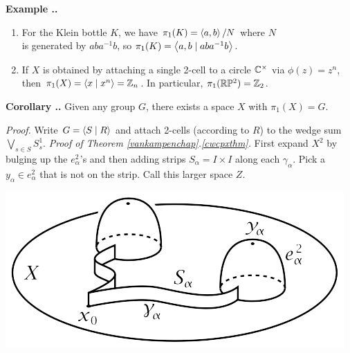 \documentclass{natsirt}
\newcounter{exm}[section]
\newenvironment{exmbox}[1][]{
\begin{redbox}[#1]\refstepcounter{exm}\textbf{Example \thesection.\theexm. }}{\end{redbox}}
\newcounter{thm}[section]
\newenvironment{corollary}[1][]{\begin{whitebox}[#1]\textbf{Corollary \thesection.\thethm. }}{\end{whitebox}}
\begin{document}
\begin{exmbox}
    \begin{enumerate}
        \item For the Klein bottle $K$, we have $\pi_1(K) = \left\langle a,b \right\rangle/N$ where $N$\\is generated by $aba^{-1}b$, so $\pi_1(K) = \left\langle a,b \mid aba^{-1}b \right\rangle$.
        \vspace{-2.2cm}\begin{center}
            \hfill {}
        \end{center}\vspace{-1cm}
        \item If $X$ is obtained by attaching a single 2-cell to a circle $\mathbb{C}^\times$ via $\phi(z)=z^n$, then $\pi_1(X)=\left\langle x \mid x^n \right\rangle = \mathbb{Z}_n$. In particular, $\pi_1(\mathbb{R} \mathbb{P}^2) = \mathbb{Z}_2$.
    \end{enumerate}
\end{exmbox}
\begin{corollary}
    Given any group $G$, there exists a space $X$ with $\pi_1(X)=G$.
\end{corollary}
\textit{Proof.} Write $G=\left\langle S\mid R \right\rangle$ and attach 2-cells (according to $R$) to the wedge sum $\bigvee_{s\in S} S^1_s$.\QED
\newpage
\textit{Proof of Theorem \ref{vankampenchap}.\ref{cwcpxthm}.} First expand $X^2$ by bulging up the $e^2_\alpha$'s and then adding strips $S_\alpha = I\times I$ along each $\gamma_\alpha$. Pick a $y_\alpha \in e^2_\alpha$ that is not on the strip. Call this larger space $Z$.
\begin{center}
    \includegraphics[scale=0.4]{diagrams/cwcpxFG.png}
\end{center}
\end{document}

